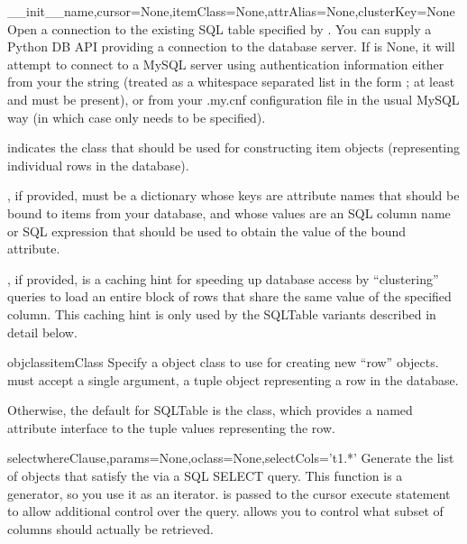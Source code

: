 \documentclass{howto}
\begin{document}
\begin{funcdesc}{__init__}{name,cursor=None,itemClass=None,attrAlias=None,clusterKey=None}
  Open a connection to the existing SQL table specified by .
  You can supply a Python DB API  providing a connection
  to the database server.  If  is None, it will attempt
  to connect to a MySQL server using authentication information either
  from your the  string (treated as a whitespace separated
  list in the form    ;
  at least  and  must be present), or from your 
  .my.cnf configuration file in the usual MySQL way (in which case only
   needs to be specified).

   indicates 
  the class that should be used for constructing item objects (representing
  individual rows in the database).

  , if provided, must be a dictionary whose keys are
  attribute names that should be bound to items from your database,
  and whose values are an SQL column name or SQL expression that should
  be used to obtain the value of the bound attribute.

  , if provided, is a caching hint for speeding up
  database access by ``clustering'' queries to load an entire block
  of rows that share the same value of the specified  column.
  This caching hint is only used by the  SQLTable variants
  described in detail below.
\end{funcdesc}

\begin{funcdesc}{objclass}{itemClass}
  Specify a object class to use for creating new ``row'' objects.
   must accept a single argument, a tuple object representing
  a row in the database.  

  Otherwise, the default  for SQLTable is
  the  class, which provides a named attribute interface
  to the tuple values representing the row.
\end{funcdesc}

\begin{funcdesc}{select}{whereClause,params=None,oclass=None,selectCols='t1.*'}
  Generate the list of objects that satisfy the 
  via a SQL SELECT query.  This function is a generator, so you
  use it as an iterator.   is passed to the
  cursor execute statement to allow additional control over
  the query.   allows you to control what subset of
  columns should actually be retrieved.
\end{funcdesc}
\end{document}
